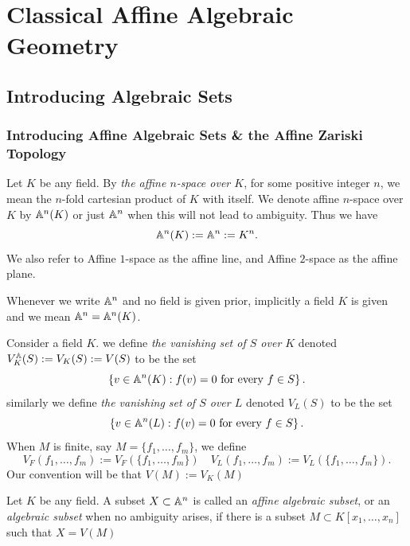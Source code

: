 \section{Classical Affine Algebraic Geometry}
\subsection{Introducing Algebraic Sets}
\subsubsection{Introducing Affine Algebraic Sets \& the Affine Zariski Topology}
\begin{definition}\label{AffineSpaceDefinition}
    Let $K$ be any field. By \textit{the affine $n$-space over $K$}, for some positive integer $n$, we mean the $n$-fold cartesian product of $K$ with itself. We denote affine $n$-space over $K$ by $\mathbb{A}^n(K)$ or just $\mathbb{A}^n$ when this will not lead to ambiguity. Thus we have 
    $$\mathbb{A}^n(K) := \mathbb{A}^n := K^n.$$
    We also refer to Affine $1$-space as the affine line, and Affine $2$-space as the affine plane. 
\end{definition}
\begin{remark}
    Whenever we write $\mathbb{A}^n$ and no field is given prior, implicitly a field $K$ is given and we mean $\mathbb{A}^n = \mathbb{A}^n(K)$.
\end{remark}
\begin{definition}\label{VanishingSetDefinition}
    Consider a field $K$. we define \textit{the vanishing set of $S$ over $K$} denoted $V^{\mathbb{A}}_K(S) := V_K(S):=V(S)$ to be the set
    $$\left\{ v\in \mathbb{A}^n(K) : f(v)=0 \text{ for every } f\in S  \right\}.$$
    similarly we define \textit{the vanishing set of $S$ over $L$} denoted $V_L(S)$ to be the set 
    $$\left\{ v\in \mathbb{A}^n(L) : f(v)=0 \text{ for every } f\in S  \right\}.$$
    When $M$ is finite, say $M= \{f_1,\dots,f_m\}$, we define 
    $$V_F(f_1,\dots,f_m) := V_F(\{f_1,\dots,f_m\}) \quad V_L(f_1,\dots,f_m) := V_L(\{f_1,\dots,f_m\}).$$
    Our convention will be that $V(M):=V_K(M)$
\end{definition}

\begin{definition}\label{AlgebraicSubsetDefinition}
    Let $K$ be any field. A subset $X \subset \mathbb{A}^n$ is called an \textit{affine algebraic subset}, or an \textit{algebraic subset} when no ambiguity arises, if there is a subset $M\subset K[x_1,\dots,x_n]$ such that $X = V(M)$ 
\end{definition}

